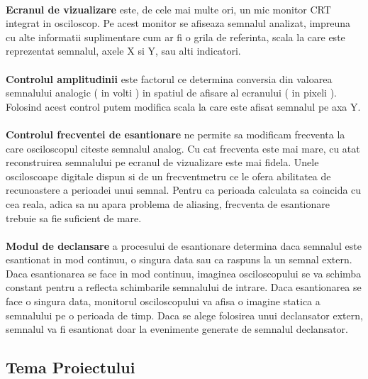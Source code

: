 \paragraph{}
{\bf Ecranul de vizualizare} este, de cele mai multe ori, un mic monitor CRT integrat in osciloscop. Pe acest monitor se afiseaza semnalul analizat, impreuna cu alte informatii suplimentare cum ar fi o grila de referinta, scala la care este reprezentat semnalul, axele X si Y, sau alti indicatori.

\paragraph{}
{\bf Controlul amplitudinii} este factorul ce determina conversia din valoarea semnalului analogic ( in volti ) in spatiul de afisare al ecranului ( in pixeli ). Folosind acest control putem modifica scala la care este afisat semnalul pe axa Y.

\paragraph{}
{\bf Controlul frecventei de esantionare} ne permite sa modificam frecventa la care osciloscopul citeste semnalul analog. Cu cat frecventa este mai mare, cu atat reconstruirea semnalului pe ecranul de vizualizare este mai fidela. Unele osciloscoape digitale dispun si de un frecventmetru ce le ofera abilitatea de recunoastere a perioadei unui semnal. Pentru ca perioada calculata sa coincida cu cea reala, adica sa nu apara problema de aliasing, frecventa de esantionare trebuie sa fie suficient de mare.

\paragraph{}
{\bf Modul de declansare} a procesului de esantionare determina daca semnalul este esantionat in mod continuu, o singura data sau ca raspuns la un semnal extern. Daca esantionarea se face in mod continuu, imaginea osciloscopului se va schimba constant pentru a reflecta schimbarile semnalului de intrare. Daca esantionarea se face o singura data, monitorul osciloscopului va afisa o imagine statica a semnalului pe o perioada de timp. Daca se alege folosirea unui declansator extern, semnalul va fi esantionat doar la evenimente generate de semnalul declansator.


\subsection{Tema Proiectului}
